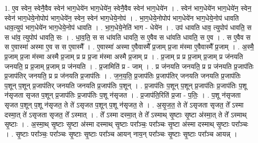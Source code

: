 \documentclass[17pt]{extarticle}
\begin{document}
1. ए॒व स्वेन॒ स्वेनै॒वैव स्वेन॑ भाग॒धेये॑न भाग॒धेये॑न॒ स्वेनै॒वैव स्वेन॑ भाग॒धेये॑न । . स्वेन॑ भाग॒धेये॑न भाग॒धेये॑न॒ स्वेन॒ स्वेन॑ भाग॒धेये॒नोपोप॑ भाग॒धेये॑न॒ स्वेन॒ स्वेन॑ भाग॒धेये॒नोप॑ । . भा॒ग॒धेये॒नोपोप॑ भाग॒धेये॑न भाग॒धेये॒नोप॑ धावति धाव॒त्युप॑ भाग॒धेये॑न भाग॒धेये॒नोप॑ धावति । . भा॒ग॒धेये॒नेति॑ भाग - धेये॑न । . उप॑ धावति धाव॒ त्युपोप॑ धावति॒ स स धा॑व॒ त्युपोप॑ धावति॒ सः । . धा॒व॒ति॒ स स धा॑वति धावति॒ स ए॒वैव स धा॑वति धावति॒ स ए॒व । . स ए॒वैव स स ए॒वास्मा॑ अस्मा ए॒व स स ए॒वास्मै᳚ । . ए॒वास्मा॑ अस्मा ए॒वैवास्मै᳚ प्र॒जाम् प्र॒जा म॑स्मा ए॒वैवास्मै᳚ प्र॒जाम् । . अ॒स्मै॒ प्र॒जाम् प्र॒जा म॑स्मा अस्मै प्र॒जाम् प्र प्र प्र॒जा म॑स्मा अस्मै प्र॒जाम् प्र । . प्र॒जाम् प्र प्र प्र॒जाम् प्र॒जाम् प्र ज॑नयति जनयति॒ प्र प्र॒जाम् प्र॒जाम् प्र ज॑नयति । . प्र॒जामिति॑ प्र - जाम् । . प्र ज॑नयति जनयति॒ प्र प्र ज॑नयति प्र॒जाप॑तिः प्र॒जाप॑तिर् जनयति॒ प्र प्र ज॑नयति प्र॒जाप॑तिः । . ज॒न॒य॒ति॒ प्र॒जाप॑तिः प्र॒जाप॑तिर् जनयति जनयति प्र॒जाप॑तिः प॒शून् प॒शून् प्र॒जाप॑तिर् जनयति जनयति प्र॒जाप॑तिः प॒शून् । . प्र॒जाप॑तिः प॒शून् प॒शून् प्र॒जाप॑तिः प्र॒जाप॑तिः प॒शू न॑सृजता सृजत प॒शून् प्र॒जाप॑तिः प्र॒जाप॑तिः प॒शू न॑सृजत । . प्र॒जाप॑ति॒रिति॑ प्र॒जा - प॒तिः॒ । . प॒शू न॑सृजता सृजत प॒शून् प॒शू न॑सृजत॒ ते ते॑ ऽसृजत प॒शून् प॒शू न॑सृजत॒ ते । . अ॒सृ॒ज॒त॒ ते ते॑ ऽसृजता सृजत॒ ते᳚ ऽस्मा दस्मा॒त् ते॑ ऽसृजता सृजत॒ ते᳚ ऽस्मात् । . ते᳚ ऽस्मा दस्मा॒त् ते ते᳚ ऽस्माथ् सृ॒ष्टाः सृ॒ष्टा अ॑स्मा॒त् ते ते᳚ ऽस्माथ् सृ॒ष्टाः । . अ॒स्मा॒थ् सृ॒ष्टाः सृ॒ष्टा अ॑स्मा दस्माथ् सृ॒ष्टाः परा᳚ञ्चः॒ परा᳚ञ्चः सृ॒ष्टा अ॑स्मा दस्माथ् सृ॒ष्टाः परा᳚ञ्चः । . सृ॒ष्टाः परा᳚ञ्चः॒ परा᳚ञ्चः सृ॒ष्टाः सृ॒ष्टाः परा᳚ञ्च आयन् नाय॒न् परा᳚ञ्चः सृ॒ष्टाः सृ॒ष्टाः परा᳚ञ्च आयन्न् । \newline
\end{document}
